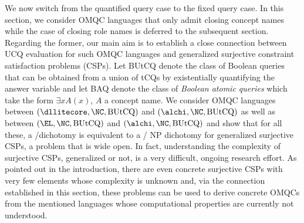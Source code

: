 \documentclass{lmcs}
\theoremstyle{definition}
\begin{document}
We now switch from the quantified query case to the fixed query case.
In this section, we consider OMQC languages that only admit closing
concept names while the case of closing role names is deferred to the
subsequent section. Regarding the former, our main aim is to establish
a close connection between UCQ evaluation for such OMQC languages and
generalized surjective constraint satisfaction problems (CSPs).  Let
BUtCQ denote the class of Boolean queries that can be obtained from a
union of tCQs by existentially quantifying the answer variable and let
BAQ denote the class of \emph{Boolean atomic queries} which take the
form $\exists x A(x)$, $A$ a concept name. We consider OMQC languages
between $(\dllitecore,\NC,\text{BUtCQ})$ and
$(\alchi,\NC,\text{BUtCQ})$ as well as between
$(\EL,\NC,\text{BUtCQ})$ and $(\alchi,\NC,\text{BUtCQ})$ and show that
for all these, a \ptime/\conp dichotomy is equivalent to a \ptime/{\sc
  NP} dichotomy for generalized surjective CSPs, a problem that is
wide open.  In fact, understanding the complexity of surjective CSPs,
generalized or not, is a very difficult, ongoing research effort. As
pointed out in the introduction, there are even concrete surjective
CSPs with very few elements whose complexity is unknown and, via the
connection established in this section, these problems can be used to
derive concrete OMQCs from the mentioned languages whose computational
properties are currently not understood.
\end{document}
